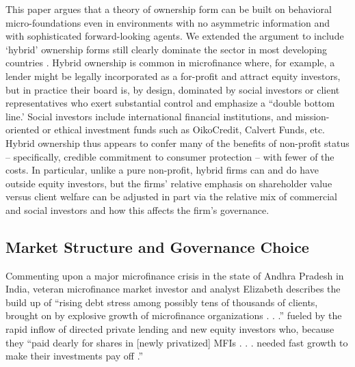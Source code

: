 \documentclass[11pt,english]{article}
\theoremstyle{plain}
\theoremstyle{definition}
\begin{document}
This paper argues that a theory of ownership
form can be built on behavioral micro-foundations even in environments
with no asymmetric information and with sophisticated forward-looking
agents. We extended the  argument to  include  `hybrid' ownership forms still clearly dominate the sector in most developing countries
\citep{cull2009,conning2011}. Hybrid ownership is common in microfinance where, for example, a lender might be legally incorporated as a for-profit and attract equity investors, but in practice their board is, by  design, dominated by social investors or client representatives  who  exert substantial
control and emphasize a ``double bottom line.' 
Social investors include international financial institutions, and mission-oriented or ethical investment funds such as OikoCredit,  Calvert Funds, etc. 
Hybrid ownership  thus appears to confer
many of the benefits of non-profit status -- specifically, credible
commitment to consumer protection -- with fewer of the costs. In particular,
unlike a pure non-profit, hybrid firms can and do have  outside equity investors, but the firms' relative emphasis on shareholder value versus client welfare can be adjusted in part via the relative mix of commercial and social investors and how this affects the firm's governance. 
\subsection{Market Structure and Governance Choice}



Commenting upon a major microfinance crisis in the state of Andhra
Pradesh in India, veteran microfinance market investor and analyst
Elizabeth \citet{rhyne2011} describes the build up of ``rising debt
stress among possibly tens of thousands of clients, brought on by
explosive growth of microfinance organizations . . .\textquotedblright{}
fueled by the rapid inflow of directed private lending and new equity
investors who, because they ``paid dearly for shares in {[}newly
privatized{]} MFIs . . . needed fast growth to make their investments
pay off .\textquotedblright{}
\end{document}
